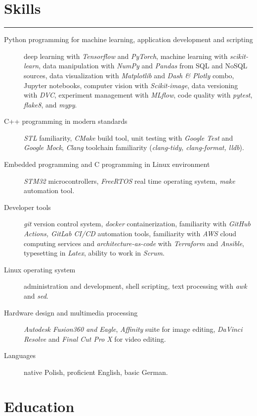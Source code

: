 \documentclass{article}
\begin{document}
\section*{Skills}

\hrule \medskip

\begin{description}
	\item[Python programming for machine learning, application development and scripting]
		deep learning with \textit{Tensorflow} and \textit{PyTorch},
		machine learning with \textit{scikit-learn},
		data manipulation with \textit{NumPy} and \textit{Pandas} from SQL and NoSQL sources,
		data visualization with \textit{Matplotlib} and \textit{Dash \& Plotly} combo,
		Jupyter notebooks,
		computer vision with \textit{Scikit-image},
		data versioning with \textit{DVC},
		experiment management with \textit{MLflow},
		code quality with \textit{pytest}, \textit{flake8}, and \textit{mypy}.
	\item[C++ programming in modern standards]
		\textit{STL} familiarity,
		\textit{CMake} build tool,
		unit testing with \textit{Google Test} and \textit{Google Mock},
		\textit{Clang} toolchain familiarity (\textit{clang-tidy, clang-format, lldb}).
	\item[Embedded programming and C programming in Linux environment]
		\textit{STM32} microcontrollers,
		\textit{FreeRTOS} real time operating system,
		\textit{make} automation tool.
	\item[Developer tools]
		\textit{git} version control system,
		\textit{docker} containerization,
		familiarity with \textit{GitHub Actions, GitLab CI/CD} automation tools,
		familiarity with \textit{AWS} cloud computing services and
		\textit{architecture-as-code} with \textit{Terraform} and
		\textit{Ansible}, typesetting in \textit{Latex}, ability to work in
		\textit{Scrum}.
	\item[Linux operating system]
		administration and development,
		shell scripting,
		text processing with \textit{awk} and \textit{sed}.
	\item[Hardware design and multimedia processing]
		\textit{Autodesk Fusion360 and Eagle},
		\textit{Affinity} suite for image editing,
		\textit{DaVinci Resolve} and \textit{Final Cut Pro X} for video editing.
	\item[Languages]
		native Polish,
		proficient English,
		basic German.
\end{description}

\section*{Education}
\end{document}
